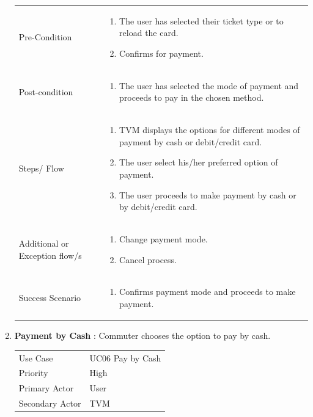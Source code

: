 \documentclass[15pt]{article}
\begin{document}
\begin{enumerate}[leftmargin=2em, itemsep=0pt, parsep=0pt, , font=\Large\bfseries]
\begin{tabularx}{1\textwidth} { 
  | >{\raggedright\arraybackslash}X 
  | >{\raggedright\arraybackslash}X 
  | }
 Pre-Condition  & 
 \begin{enumerate}
  \item The user has selected their ticket type or to reload the card.
  \item Confirms for payment.
  \end{enumerate}
  \\
  
   Post-condition  & \begin{enumerate}
  \item The user has selected the mode of payment and proceeds to pay in the chosen method.
  \end{enumerate}
  \\
  
  Steps/ Flow  & \begin{enumerate}
  \item TVM displays the options for different modes of payment by cash or debit/credit card.
  \item The user select his/her preferred option of payment.
  \item The user proceeds to make payment by cash or by debit/credit card.
  \end{enumerate}
  \\
  
   Additional or Exception flow/s  & \begin{enumerate}
  \item  Change payment mode.
  \item  Cancel process.
  \end{enumerate}
  \\
    
   Success Scenario  & \begin{enumerate}
  \item Confirms payment mode and proceeds to make payment.
  \end{enumerate}
  \\

\hline
\end{tabularx}



\newpage
\item {\Large\bfseries{Payment by Cash}} : Commuter chooses the option to pay by cash.
\newline
\newline
\begin{tabularx}{1\textwidth} { 
  | >{\raggedright\arraybackslash}X 
  | >{\raggedright\arraybackslash}X 
  | }
 \hline
 Use Case & UC06 Pay by Cash \\
 Priority & High \\
 Primary Actor  & User \\
 Secondary Actor  & TVM \\


\end{tabularx}
\end{enumerate}
\end{document}
